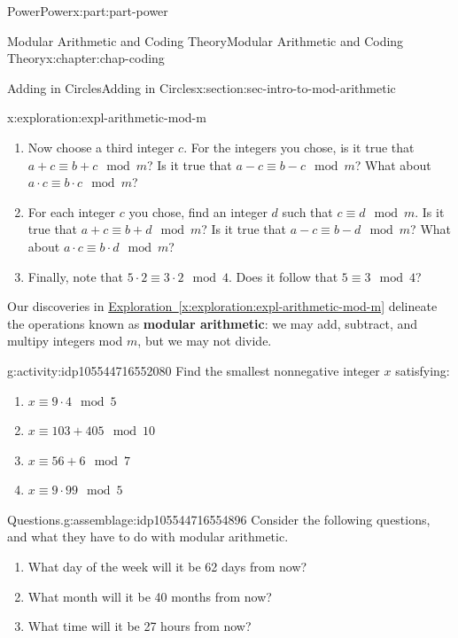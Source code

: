 \documentclass[oneside,10pt,]{book}
\newcommand{\xreffont}{\relax}
\newcommand{\terminology}[1]{\textbf{#1}}
\numberwithin{equation}{section}
\begin{document}
\begin{partptx}{Power}{}{Power}{}{}{x:part:part-power}
\begin{chapterptx}{Modular Arithmetic and Coding Theory}{}{Modular Arithmetic and Coding Theory}{}{}{x:chapter:chap-coding}
\begin{sectionptx}{Adding in Circles}{}{Adding in Circles}{}{}{x:section:sec-intro-to-mod-arithmetic}
\begin{exploration}{}{x:exploration:expl-arithmetic-mod-m}
%
\begin{enumerate}
\item{}Now choose a third integer \(c\). For the integers you chose, is it true that \(a+c \equiv b+c\mod m\)? Is it true that \(a-c \equiv b-c\mod m\)? What about \(a\cdot c\equiv b\cdot c\mod m\)?%
\item{}For each integer \(c\) you chose, find an integer \(d\) such that \(c\equiv d\mod m\). Is it true that \(a+c \equiv b+d\mod m\)? Is it true that \(a-c \equiv b-d\mod m\)? What about \(a\cdot c \equiv b\cdot d\mod m\)?%
\item{}Finally, note that \(5\cdot 2 \equiv 3\cdot 2\mod 4\). Does it follow that \(5\equiv 3\mod 4\)?%
\end{enumerate}
\end{exploration}%
Our discoveries in \hyperref[x:exploration:expl-arithmetic-mod-m]{Exploration~{\xreffont\ref{x:exploration:expl-arithmetic-mod-m}}} delineate the operations known as \terminology{modular arithmetic}: we may add, subtract, and multipy integers mod \(m\), but we may not divide.%
\begin{activity}{}{g:activity:idp105544716552080}%
Find the smallest nonnegative integer \(x\) satisfying:%
%
\begin{enumerate}
\item{}\(\displaystyle x\equiv 9\cdot 4\mod 5\)%
\item{}\(\displaystyle x\equiv 103+405\mod 10\)%
\item{}\(\displaystyle x \equiv 56 + 6\mod 7\)%
\item{}\(\displaystyle x \equiv 9\cdot 99\mod 5\)%
\end{enumerate}
\end{activity}%
\begin{assemblage}{Questions.}{g:assemblage:idp105544716554896}%
Consider the following questions, and what they have to do with modular arithmetic. %
\begin{enumerate}
\item{}What day of the week will it be 62 days from now?%
\item{}What month will it be 40 months from now?%
\item{}What time will it be 27 hours from now?%
\end{enumerate}
%
\end{assemblage}
\end{sectionptx}
%
%
\typeout{************************************************}
\typeout{************************************************}

\end{chapterptx}
\end{partptx}
\end{document}
